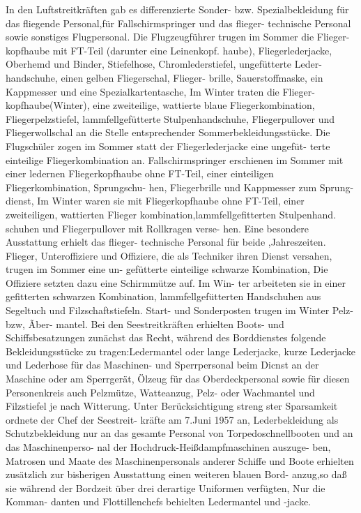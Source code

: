 In den Luftstreitkräften gab es differenzierte
Sonder- bzw. Spezialbekleidung für das fliegende
Personal,für Fallschirmspringer und das flieger-
technische Personal sowie sonstiges Flugpersonal.
Die Flugzeugführer trugen im Sommer die Flieger-
kopfhaube mit FT-Teil (darunter eine Leinenkopf.
haube), Fliegerlederjacke, Oberhemd und Binder,
Stiefelhose, Chromlederstiefel, ungefütterte Leder-
handschuhe, einen gelben Fliegerschal, Flieger-
brille, Sauerstoffmaske, ein Kappmesser und eine
Spezialkartentasche, Im Winter traten die Flieger-
kopfhaube(Winter), eine zweiteilige, wattierte
blaue Fliegerkombination, Fliegerpelzstiefel, lammfellgefütterte Stulpenhandschuhe, Fliegerpullover
und Fliegerwollschal an die Stelle entsprechender
Sommerbekleidungsstücke. Die Flugschüler zogen
im Sommer statt der Fliegerlederjacke eine ungefüt-
terte einteilige Fliegerkombination an.
Fallschirmspringer erschienen im Sommer mit
einer ledernen Fliegerkopfhaube ohne FT-Teil,
einer einteiligen Fliegerkombination, Sprungschu-
hen, Fliegerbrille und Kappmesser zum Sprung-
dienst, Im Winter waren sie mit Fliegerkopfhaube
ohne FT-Teil, einer zweiteiligen, wattierten Flieger
kombination,lammfellgefitterten Stulpenhand.
schuhen und Fliegerpullover mit Rollkragen verse-
hen.
Eine besondere Ausstattung erhielt das flieger-
technische Personal für beide ,Jahreszeiten. Flieger,
Unteroffiziere und Offiziere, die als Techniker
ihren Dienst versahen, trugen im Sommer eine un-
gefütterte einteilige schwarze Kombination, Die Offiziere setzten dazu eine Schirmmütze auf. Im Win-
ter arbeiteten sie in einer gefitterten schwarzen
Kombination,
lammfellgefütterten Handschuhen
aus Segeltuch und Filzschaftstiefeln. Start- und
Sonderposten trugen im Winter Pelz- bzw, Ãber-
mantel.
Bei den Seestreitkräften erhielten Boots- und
Schiffsbesatzungen zunächst das Recht, während
des Borddienstes folgende Bekleidungsstücke zu
tragen:Ledermantel oder lange Lederjacke, kurze
Lederjacke und Lederhose für das Maschinen- und
Sperrpersonal beim Dicnst an der Maschine oder
am Sperrgerät, Ölzeug für das Oberdeckpersonal
sowie für diesen Personenkreis auch Pelzmütze,
Watteanzug, Pelz- oder Wachmantel und Filzstiefel je nach Witterung. Unter Berücksichtigung streng
ster Sparsamkeit ordnete der Chef der Seestreit-
kräfte am 7.Juni 1957 an, Lederbekleidung als
Schutzbekleidung nur an das gesamte Personal von
Torpedoschnellbooten und an das Maschinenperso-
nal der Hochdruck-Heißdampfmaschinen auszuge-
ben, Matrosen und Maate des Maschinenpersonals
anderer Schiffe und Boote erhielten zusätzlich zur
bisherigen Ausstattung einen weiteren blauen Bord-
anzug,so daß sie während der Bordzeit über drei
derartige Uniformen verfügten, Nur die Komman-
danten und Flottillenchefs behielten Ledermantel
und -jacke.
